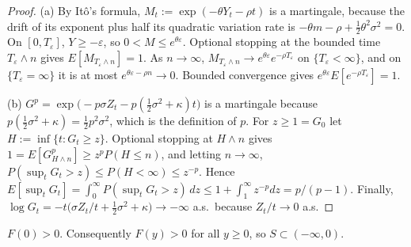 \begin{proof}
(a) By It\^o's formula, $M_t:=\exp(-\theta Y_t-\rho t)$ is a martingale, because the drift of its exponent plus half its quadratic variation rate is $-\theta m-\rho+\tfrac12\theta^2\sigma^2=0$. On $[0,T_\varepsilon]$, $Y\ge-\varepsilon$, so $0<M\le e^{\theta\varepsilon}$. Optional stopping at the bounded time $T_\varepsilon\wedge n$ gives $E[M_{T_\varepsilon\wedge n}]=1$. As $n\to\infty$, $M_{T_\varepsilon\wedge n}\to e^{\theta\varepsilon}e^{-\rho T_\varepsilon}$ on $\{T_\varepsilon<\infty\}$, and on $\{T_\varepsilon=\infty\}$ it is at most $e^{\theta\varepsilon-\rho n}\to0$. Bounded convergence gives $e^{\theta\varepsilon}E[e^{-\rho T_\varepsilon}]=1$.

(b) $G^p=\exp\big(-p\sigma Z_t-p(\tfrac12\sigma^2+\kappa)t\big)$ is a martingale because $p(\tfrac12\sigma^2+\kappa)=\tfrac12p^2\sigma^2$, which is the definition of $p$. For $z\ge1=G_0$ let $H:=\inf\{t:G_t\ge z\}$. Optional stopping at $H\wedge n$ gives $1=E[G^p_{H\wedge n}]\ge z^pP(H\le n)$, and letting $n\to\infty$, $P(\sup_tG_t>z)\le P(H<\infty)\le z^{-p}$. Hence $E[\sup_tG_t]=\int_0^\infty P(\sup_tG_t>z)\,dz\le1+\int_1^\infty z^{-p}dz=p/(p-1)$. Finally, $\log G_t=-t\big(\sigma Z_t/t+\tfrac12\sigma^2+\kappa\big)\to-\infty$ a.s.\ because $Z_t/t\to0$ a.s.
\end{proof}

\begin{alemma}\label{lem:above}
$F(0)>0$. Consequently $F(y)>0$ for all $y\ge0$, so $S\subset(-\infty,0)$.
\end{alemma}

